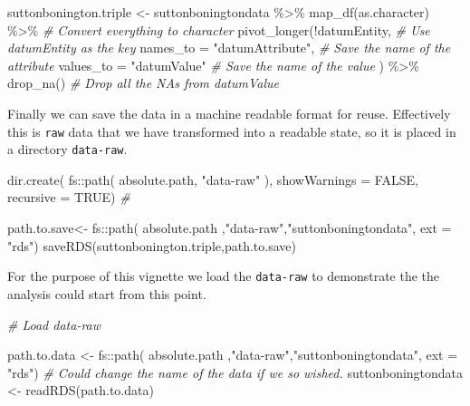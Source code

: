 \documentclass{article}
\newenvironment{Shaded}{\begin{snugshade}}{\end{snugshade}}
\newcommand{\AttributeTok}[1]{\textcolor[rgb]{0.77,0.63,0.00}{#1}}
\newcommand{\CommentTok}[1]{\textcolor[rgb]{0.56,0.35,0.01}{\textit{#1}}}
\newcommand{\ConstantTok}[1]{\textcolor[rgb]{0.00,0.00,0.00}{#1}}
\newcommand{\FunctionTok}[1]{\textcolor[rgb]{0.00,0.00,0.00}{#1}}
\newcommand{\NormalTok}[1]{#1}
\newcommand{\OtherTok}[1]{\textcolor[rgb]{0.56,0.35,0.01}{#1}}
\newcommand{\SpecialCharTok}[1]{\textcolor[rgb]{0.00,0.00,0.00}{#1}}
\newcommand{\StringTok}[1]{\textcolor[rgb]{0.31,0.60,0.02}{#1}}
\begin{document}
\begin{Shaded}
\begin{Highlighting}[]
\NormalTok{suttonbonington.triple }\OtherTok{\textless{}{-}}\NormalTok{ suttonboningtondata }\SpecialCharTok{\%\textgreater{}\%} 
                  \FunctionTok{map\_df}\NormalTok{(as.character) }\SpecialCharTok{\%\textgreater{}\%} \CommentTok{\# Convert everything to character}
                  \FunctionTok{pivot\_longer}\NormalTok{(}\SpecialCharTok{!}\NormalTok{datumEntity, }\CommentTok{\# Use datumEntity as the key}
                  \AttributeTok{names\_to =} \StringTok{"datumAttribute"}\NormalTok{, }\CommentTok{\# Save the name of the attribute}
                  \AttributeTok{values\_to =} \StringTok{"datumValue"} \CommentTok{\# Save the name of the value}
\NormalTok{                  ) }\SpecialCharTok{\%\textgreater{}\%} 
                  \FunctionTok{drop\_na}\NormalTok{() }\CommentTok{\# Drop all the NAs from datumValue}
\end{Highlighting}
\end{Shaded}

Finally we can save the data in a machine readable format for reuse. Effectively this is \texttt{raw} data that we have transformed into a readable state, so it is placed in a directory \texttt{data-raw}.

\begin{Shaded}
\begin{Highlighting}[]
\FunctionTok{dir.create}\NormalTok{( }
\NormalTok{          fs}\SpecialCharTok{::}\FunctionTok{path}\NormalTok{( absolute.path,}
            \StringTok{"data{-}raw"}\NormalTok{ ),  }
            \AttributeTok{showWarnings =} \ConstantTok{FALSE}\NormalTok{,}
            \AttributeTok{recursive =} \ConstantTok{TRUE}\NormalTok{) }\CommentTok{\# }

\NormalTok{path.to.save}\OtherTok{\textless{}{-}}\NormalTok{ fs}\SpecialCharTok{::}\FunctionTok{path}\NormalTok{( absolute.path}
\NormalTok{                               ,}\StringTok{"data{-}raw"}\NormalTok{,}\StringTok{"suttonboningtondata"}\NormalTok{, }\AttributeTok{ext =} \StringTok{"rds"}\NormalTok{)}
\FunctionTok{saveRDS}\NormalTok{(suttonbonington.triple,path.to.save)}
\end{Highlighting}
\end{Shaded}

For the purpose of this vignette we load the \texttt{data-raw} to demonstrate the the analysis could start from this point.

\begin{Shaded}
\begin{Highlighting}[]
\CommentTok{\# Load data{-}raw}

\NormalTok{path.to.data }\OtherTok{\textless{}{-}}\NormalTok{ fs}\SpecialCharTok{::}\FunctionTok{path}\NormalTok{( absolute.path}
\NormalTok{                               ,}\StringTok{"data{-}raw"}\NormalTok{,}\StringTok{"suttonboningtondata"}\NormalTok{, }\AttributeTok{ext =} \StringTok{"rds"}\NormalTok{)}
\CommentTok{\# Could change the name of the data if we so wished.}
\NormalTok{suttonboningtondata }\OtherTok{\textless{}{-}}  \FunctionTok{readRDS}\NormalTok{(path.to.data)}
\end{Highlighting}
\end{Shaded}
\end{document}
